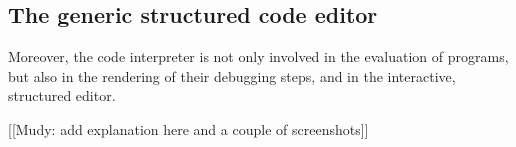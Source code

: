 \subsection{The generic structured code editor}
Moreover, the code interpreter is not only involved in the evaluation of programs, but also in the rendering of their debugging steps, and in the interactive, structured editor.

[[Mudy: add explanation here and a couple of screenshots]]

